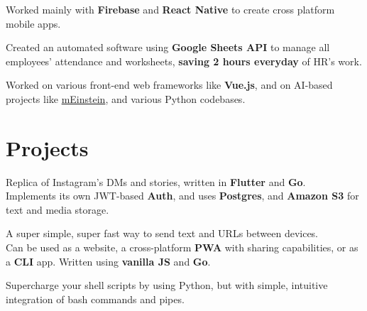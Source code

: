 \documentclass[]{resume}
\begin{document}
\begin{minipage}[t]{0.62\textwidth}
\begin{tightemize}
\item Worked mainly with \textbf{Firebase} and \textbf{React Native} to create cross platform mobile apps.
\end{tightemize}
\sectionsep


\begin{tightemize}
\item Created an automated software using \textbf{Google Sheets API} to manage all employees’ attendance and worksheets, \textbf{saving 2 hours everyday} of HR's work.
\item Worked on various front-end web frameworks like \textbf{Vue.js}, and on AI-based projects like \href{https://meinstein.ai/}{mEinstein}, and various Python codebases.
\end{tightemize}
\sectionsep



\section{Projects}

Replica of Instagram's DMs and stories, written in \textbf{Flutter} and \textbf{Go}.\\
Implements its own JWT-based \textbf{Auth}, and uses \textbf{Postgres}, and \textbf{Amazon S3} for text and media storage.
\sectionsep

A super simple, super fast way to send text and URLs between devices.\\
Can be used as a website, a cross-platform \textbf{PWA} with sharing capabilities, or as a \textbf{CLI} app. Written using \textbf{vanilla JS} and \textbf{Go}.
\sectionsep

Supercharge your shell scripts by using Python, but with simple, intuitive integration of bash commands and pipes.
\sectionsep


\end{minipage}
\end{document}
